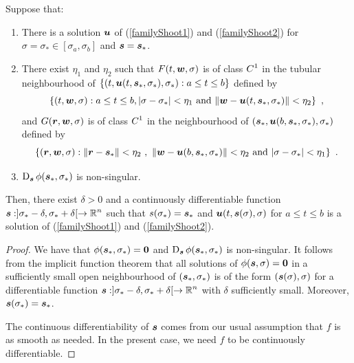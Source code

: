\begin{theorem}
Suppose that:
\begin{enumerate}
\item  There is a solution $\bm{u}$ of (\ref{familyShoot1}) and
(\ref{familyShoot2}) for $\sigma = \sigma_\ast \in [\sigma_a,\sigma_b]$
and $\bm{s} = \bm{s}_\ast$.
\item There exist $\eta_1$ and $\eta_2$ such that $F(t,\bm{w},\sigma)$ is of
class $\displaystyle C^1$ in the tubular neighbourhood of
$\{ (t,\bm{u}(t,\bm{s}_\ast,\sigma_\ast),\sigma_\ast) : a\leq t \leq b\}$
defined by
\[
\left\{ (t,\bm{w},\sigma) :
a \leq t\leq b, |\sigma - \sigma_\ast|<\eta_1
\text{ and } \|\bm{w} - \bm{u}(t,\bm{s}_\ast,\sigma_\ast) \| <
\eta_2 \right\} \ ,
\]
and $G(\bm{r},\bm{w}, \sigma)$ is of class $\displaystyle C^1$ in the
neighbourhood of
$(\bm{s}_\ast,\bm{u}(b,\bm{s}_\ast,\sigma_\ast),\sigma_\ast)$ defined
by
\[
\left\{ (\VEC{r},\VEC{w},\sigma) :
\|\VEC{r} - \VEC{s}_\ast\| < \eta_2 \ , \ 
\|\VEC{w} - \VEC{u}(b,\VEC{s}_\ast,\sigma_\ast)\| < \eta_2
\text{ and } |\sigma - \sigma_\ast| < \eta_1 \right\} \ .
\]
\item $\displaystyle \operatorname{D}_{\bm{s}}\phi(\bm{s}_\ast,\sigma_\ast)$ is
non-singular.
\end{enumerate}
Then, there exist $\delta>0$ and a continuously differentiable function
$\displaystyle \bm{s}:]\sigma_\ast -\delta,\sigma_\ast + \delta[ \to \mathbb{R}^n$
such that $s(\sigma_\ast) = \bm{s}_\ast$ and
$\bm{u}(t,\bm{s}(\sigma),\sigma)$ for $a\leq t \leq b$ is
a solution of (\ref{familyShoot1}) and (\ref{familyShoot2}).
\end{theorem}

\begin{proof}
We have that $\phi(\bm{s}_\ast,\sigma_\ast) = \bm{0}$ and
$\operatorname{D}_{\bm{s}}\phi(\bm{s}_\ast,\sigma_\ast)$ is non-singular.
It follows from the implicit function theorem that all solutions
of $\phi(\bm{s},\sigma) = \bm{0}$ in a sufficiently small
open neighbourhood of $(\bm{s}_\ast,\sigma_\ast)$ is of the form
$(\bm{s}(\sigma),\sigma)$ for a differentiable function
$\displaystyle \bm{s} : ]\sigma_\ast-\delta,\sigma_\ast+\delta[ \to \mathbb{R}^n$ with
$\delta$ sufficiently small.  Moreover,
$\bm{s}(\sigma_\ast) = \bm{s}_\ast$.

The continuous differentiability of $\bm{s}$ comes from our usual
assumption that $f$ is as smooth as needed.  In the present case, we
need $f$ to be continuously differentiable.
\end{proof}

